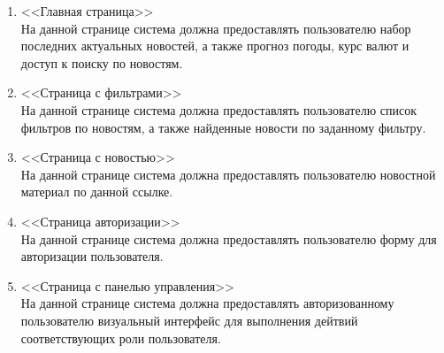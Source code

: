 \begin{enumerate}
    \item <<Главная страница>>\\
    На данной странице система должна предоставлять пользователю набор последних актуальных новостей, а также прогноз погоды, курс валют и доступ к поиску по новостям.
    \item <<Страница с фильтрами>>\\
    На данной странице система должна предоставлять пользователю список фильтров по новостям, а также найденные новости по заданному фильтру.
    \item <<Страница с новостью>>\\
    На данной странице система должна предоставлять пользователю новостной материал по данной ссылке.
    \item <<Страница авторизации>>\\
    На данной странице система должна предоставлять пользователю форму для авторизации пользователя.
    \item <<Страница с панелью управления>>\\
    На данной странице система должна предоставлять авторизованному пользователю визуальный интерфейс для выполнения дейтвий соответствующих роли пользователя.
\end{enumerate}
